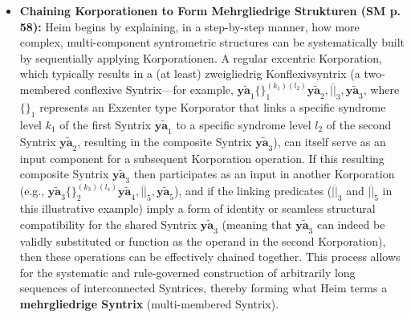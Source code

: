 \documentclass[12pt]{article}
\newcommand{\syntrix}{\bm{y\widetilde{a}}}
\begin{document}
\begin{itemize}
    \item \textbf{Chaining Korporationen to Form Mehrgliedrige Strukturen (SM p. 58):}
    Heim begins by explaining, in a step-by-step manner, how more complex, multi-component syntrometric structures can be systematically built by sequentially applying Korporationen. A regular excentric Korporation, which typically results in a (at least) zweigliedrig Konflexivsyntrix (a two-membered conflexive Syntrix—for example, \( \syntrix_1 \{ \}_{1}^{(k_1)(l_2)} \syntrix_2, \overline{||}_3, \syntrix_3 \), where \( \{ \}_1 \) represents an Exzenter type Korporator that links a specific syndrome level \( k_1 \) of the first Syntrix \( \syntrix_1 \) to a specific syndrome level \( l_2 \) of the second Syntrix \( \syntrix_2 \), resulting in the composite Syntrix \( \syntrix_3 \)), can itself serve as an input component for a subsequent Korporation operation. If this resulting composite Syntrix \( \syntrix_3 \) then participates as an input in another Korporation (e.g., \( \syntrix_3 \{ \}_{2}^{(k_3)(l_4)} \syntrix_4, \overline{||}_5, \syntrix_5 \)), and if the linking predicates (\( \overline{||}_3 \) and \( \overline{||}_5 \) in this illustrative example) imply a form of identity or seamless structural compatibility for the shared Syntrix \( \syntrix_3 \) (meaning that \( \syntrix_3 \) can indeed be validly substituted or function as the operand in the second Korporation), then these operations can be effectively chained together. This process allows for the systematic and rule-governed construction of arbitrarily long sequences of interconnected Syntrices, thereby forming what Heim terms a \textbf{mehrgliedrige Syntrix} (multi-membered Syntrix).


\end{itemize}
\end{document}
